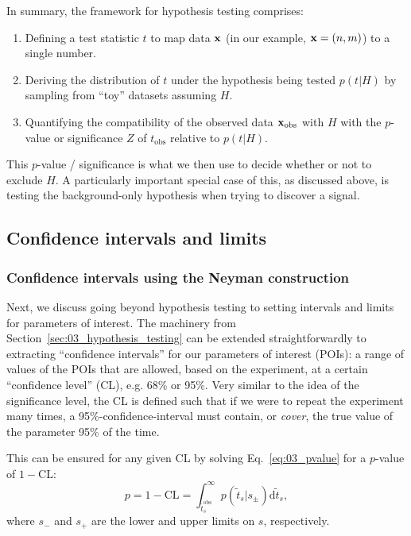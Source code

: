 
In summary, the framework for hypothesis testing comprises:

\begin{enumerate}
    \item Defining a test statistic $t$ to map data $\mathbf{x}$ (in our example, $\mathbf{x} = (n, m)$) to a single number.
    \item Deriving the distribution of $t$ under the hypothesis being tested $p(t|H)$ by sampling from ``toy'' datasets assuming $H$.
    \item Quantifying the compatibility of the observed data $\mathbf{x}_\mathrm{obs}$ with $H$ with the $p$-value or significance $Z$ of $t_\mathrm{obs}$ relative to $p(t|H)$.
\end{enumerate}

This $p$-value / significance is what we then use to decide whether or not to exclude $H$. 
A particularly important special case of this, as discussed above, is testing the background-only hypothesis when trying to discover a signal.

\subsection{Confidence intervals and limits}
\label{sec:03_intervals}

\subsubsection{Confidence intervals using the Neyman construction}

Next, we discuss going beyond hypothesis testing to setting intervals and limits for parameters of interest.
The machinery from Section~\ref{sec:03_hypothesis_testing} can be extended straightforwardly to extracting ``confidence intervals'' for our parameters of interest (POIs): a range of values of the POIs that are allowed, based on the experiment, at a certain ``confidence level'' (CL), e.g. 68\% or 95\%. 
Very similar to the idea of the significance level, the CL is defined such that if we were to repeat the experiment many times, a 95\%-confidence-interval must contain, or \textit{cover}, the true value of the parameter 95\% of the time. 

This can be ensured for any given CL by solving Eq.~\ref{eq:03_pvalue} for a $p$-value of $1 - \mathrm{CL}$: 
\begin{equation}
p = 1 - \mathrm{CL} = \int_{\tilde{t}^\mathrm{obs}_s}^{\infty}p(\tilde{t}_s|s_\pm)\mathrm d \tilde{t}_s,
\label{eq:03_cl}
\end{equation}
where $s_-$ and $s_+$ are the lower and upper limits on $s$, respectively.

